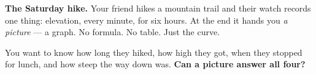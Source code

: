 \documentclass[10pt]{article}
\begin{document}
\vspace{0.10in}

\boxguard[12]
\begin{hookbox}
\small
\textbf{The Saturday hike.} Your friend hikes a mountain trail and their watch records one thing:
elevation, every minute, for six hours. At the end it hands you \emph{a picture} --- a graph. No
formula. No table. Just the curve.

You want to know how long they hiked, how high they got, when they stopped for lunch, and how
steep the way down was. \textbf{Can a picture answer all four?}

\\
\\
\end{hookbox}

\vspace{0.10in}
\end{document}

